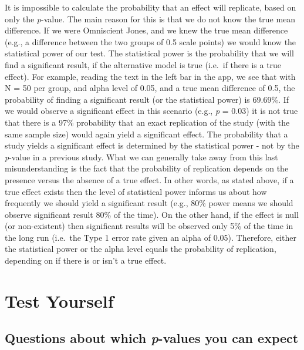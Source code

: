 \documentclass[
]{krantz}
\begin{document}
It is impossible to calculate the probability that an effect will replicate, based on only the \emph{p}-value. The main reason for this is that we do not know the true mean difference. If we were Omniscient Jones, and we knew the true mean difference (e.g., a difference between the two groups of 0.5 scale points) we would know the statistical power of our test. The statistical power is the probability that we will find a significant result, if the alternative model is true (i.e.~if there is a true effect). For example, reading the text in the left bar in the app, we see that with N = 50 per group, and alpha level of 0.05, and a true mean difference of 0.5, the probability of finding a significant result (or the statistical power) is 69.69\%. If we would observe a significant effect in this scenario (e.g., \emph{p} = 0.03) it is not true that there is a 97\% probability that an exact replication of the study (with the same sample size) would again yield a significant effect. The probability that a study yields a significant effect is determined by the statistical power - not by the \emph{p}-value in a previous study.
What we can generally take away from this last misunderstanding is the fact that the probability of replication depends on the presence versus the absence of a true effect. In other words, as stated above, if a true effect exists then the level of statistical power informs us about how frequently we should yield a significant result (e.g., 80\% power means we should observe significant result 80\% of the time). On the other hand, if the effect is null (or non-existent) then significant results will be observed only 5\% of the time in the long run (i.e.~the Type 1 error rate given an alpha of 0.05). Therefore, either the statistical power or the alpha level equals the probability of replication, depending on if there is or isn't a true effect.

\hypertarget{test-yourself}{%
\section{Test Yourself}\label{test-yourself}}

\hypertarget{questions-about-which-p-values-you-can-expect}{%
\subsection{\texorpdfstring{Questions about which \emph{p}-values you can expect}{Questions about which p-values you can expect}}\label{questions-about-which-p-values-you-can-expect}}
\end{document}
